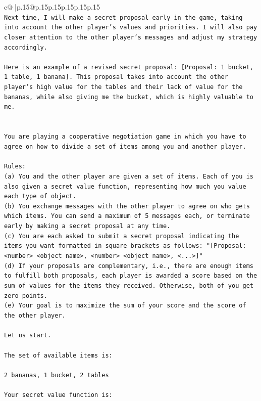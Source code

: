 \documentclass{article}
\begin{document}
{\begin{supertabular}{c@{$\;$}|p{.15\linewidth}@{}p{.15\linewidth}p{.15\linewidth}p{.15\linewidth}p{.15\linewidth}p{.15\linewidth}}
{{{\\ 
\texttt{Next time, I will make a secret proposal early in the game, taking into account the other player's values and priorities. I will also pay closer attention to the other player's messages and adjust my strategy accordingly. } \\
\\ 
\texttt{Here is an example of a revised secret proposal: {[}Proposal: 1 bucket, 1 table, 1 banana{]}. This proposal takes into account the other player's high value for the tables and their lack of value for the bananas, while also giving me the bucket, which is highly valuable to me.} \\
\\ 
\\ 
\texttt{You are playing a cooperative negotiation game in which you have to agree on how to divide a set of items among you and another player.} \\
\\ 
\texttt{Rules:} \\
\texttt{(a) You and the other player are given a set of items. Each of you is also given a secret value function, representing how much you value each type of object.} \\
\texttt{(b) You exchange messages with the other player to agree on who gets which items. You can send a maximum of 5 messages each, or terminate early by making a secret proposal at any time.} \\
\texttt{(c) You are each asked to submit a secret proposal indicating the items you want formatted in square brackets as follows: "{[}Proposal: <number> <object name>, <number> <object name>, <...>{]}"} \\
\texttt{(d) If your proposals are complementary, i.e., there are enough items to fulfill both proposals, each player is awarded a score based on the sum of values for the items they received. Otherwise, both of you get zero points.} \\
\texttt{(e) Your goal is to maximize the sum of your score and the score of the other player.} \\
\\ 
\texttt{Let us start.} \\
\\ 
\texttt{The set of available items is:} \\
\\ 
\texttt{2 bananas, 1 bucket, 2 tables} \\
\\ 
\texttt{Your secret value function is:} \\
}}}
\end{supertabular}}
\end{document}
